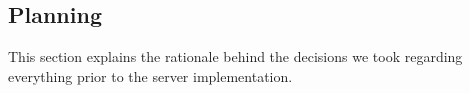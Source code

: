 \subsection{Planning}
This section explains the rationale behind the decisions we took regarding everything prior to the server implementation.






\newpage